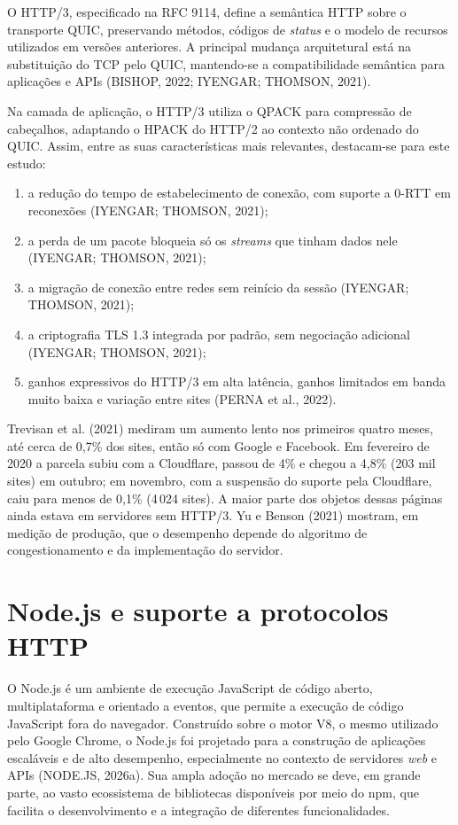 O HTTP/3, especificado na RFC 9114, define a semântica HTTP sobre o transporte QUIC, preservando métodos, códigos de \textit{status} e o modelo de recursos utilizados em versões anteriores. A principal mudança arquitetural está na substituição do TCP pelo QUIC, mantendo-se a compatibilidade semântica para aplicações e APIs (BISHOP, 2022; IYENGAR; THOMSON, 2021).

Na camada de aplicação, o HTTP/3 utiliza o QPACK para compressão de cabeçalhos, adaptando o HPACK do HTTP/2 ao contexto não ordenado do QUIC. Assim, entre as suas características mais relevantes, destacam-se para este estudo:

\begin{enumerate}[label=\alph*)]
\item a redução do tempo de estabelecimento de conexão, com suporte a 0-RTT em reconexões (IYENGAR; THOMSON, 2021);
\item a perda de um pacote bloqueia só os \textit{streams} que tinham dados nele (IYENGAR; THOMSON, 2021);
\item a migração de conexão entre redes sem reinício da sessão (IYENGAR; THOMSON, 2021);
\item a criptografia TLS 1.3 integrada por padrão, sem negociação adicional (IYENGAR; THOMSON, 2021);
\item ganhos expressivos do HTTP/3 em alta latência, ganhos limitados em banda muito baixa e variação entre sites (PERNA et al., 2022).
\end{enumerate}

Trevisan et al. (2021) mediram um aumento lento nos primeiros quatro meses, até cerca de 0,7\% dos sites, então só com Google e Facebook. Em fevereiro de 2020 a parcela subiu com a Cloudflare, passou de 4\% e chegou a 4,8\% (203 mil sites) em outubro; em novembro, com a suspensão do suporte pela Cloudflare, caiu para menos de 0,1\% (4\,024 sites). A maior parte dos objetos dessas páginas ainda estava em servidores sem HTTP/3. Yu e Benson (2021) mostram, em medição de produção, que o desempenho depende do algoritmo de congestionamento e da implementação do servidor.

\section{Node.js e suporte a protocolos HTTP}

O Node.js é um ambiente de execução JavaScript de código aberto, multiplataforma e orientado a eventos, que permite a execução de código JavaScript fora do navegador. Construído sobre o motor V8, o mesmo utilizado pelo Google Chrome, o Node.js foi projetado para a construção de aplicações escaláveis e de alto desempenho, especialmente no contexto de servidores \textit{web} e APIs (NODE.JS, 2026a). Sua ampla adoção no mercado se deve, em grande parte, ao vasto ecossistema de bibliotecas disponíveis por meio do npm, que facilita o desenvolvimento e a integração de diferentes funcionalidades.

